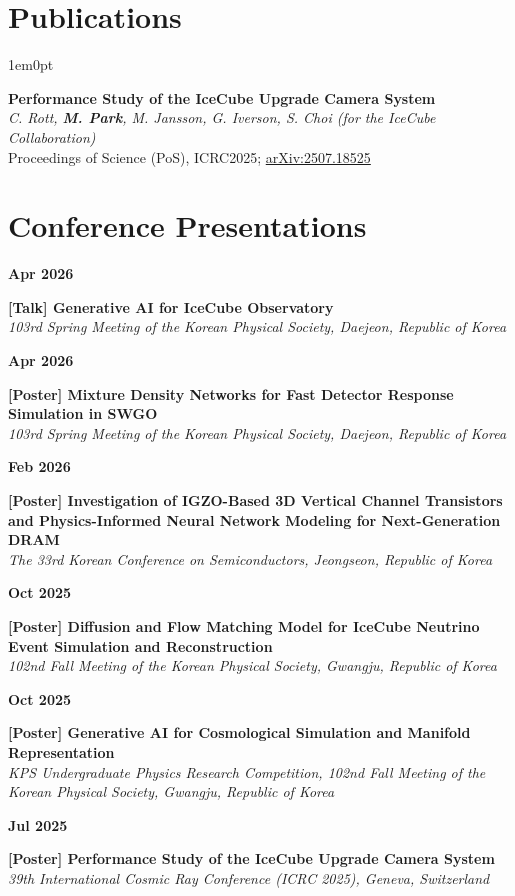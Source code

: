\documentclass[11pt, a4paper]{article}
\newcommand{\conferenceitem}[3]{%
    \noindent
    \parbox[t]{0.15\textwidth}{{\color{primary}\textbf{#1}}}%
    \hfill
    \parbox[t]{0.83\textwidth}{\textbf{#2}\\[2pt]\textit{#3}}%
    \vspace{8pt}\par
}
\newenvironment{secbody}{\begin{adjustwidth}{1em}{0pt}}{\end{adjustwidth}}
\begin{document}
\section{Publications}
\begin{secbody}

\newcommand{\publication}[3]{
    \noindent
    \textbf{#1} \\
    \textit{#2} \\
    {\small #3}
    \vspace{6pt}
}

\publication{Performance Study of the IceCube Upgrade Camera System}
{C. Rott, \textbf{\textit{M. Park}}, M. Jansson, G. Iverson, S. Choi (for the IceCube Collaboration)}
{Proceedings of Science (PoS), ICRC2025; \href{https://arxiv.org/abs/2507.18525}{arXiv:2507.18525}}
\end{secbody}

\newpage
\section{Conference Presentations}
\conferenceitem{Apr 2026}{[Talk] Generative AI for IceCube Observatory}{103rd Spring Meeting of the Korean Physical Society, Daejeon, Republic of Korea}

\conferenceitem{Apr 2026}{[Poster] Mixture Density Networks for Fast Detector Response Simulation in SWGO}{103rd Spring Meeting of the Korean Physical Society, Daejeon, Republic of Korea}

\conferenceitem{Feb 2026}{[Poster] Investigation of IGZO-Based 3D Vertical Channel Transistors and Physics-Informed Neural Network Modeling for Next-Generation DRAM}{The 33rd Korean Conference on Semiconductors, Jeongseon, Republic of Korea}

\conferenceitem{Oct 2025}{[Poster] Diffusion and Flow Matching Model for IceCube Neutrino Event Simulation and Reconstruction}{102nd Fall Meeting of the Korean Physical Society, Gwangju, Republic of Korea}

\conferenceitem{Oct 2025}{[Poster] Generative AI for Cosmological Simulation and Manifold Representation}{KPS Undergraduate Physics Research Competition, 102nd Fall Meeting of the Korean Physical Society, Gwangju, Republic of Korea}

\conferenceitem{Jul 2025}{[Poster] Performance Study of the IceCube Upgrade Camera System}{39th International Cosmic Ray Conference (ICRC 2025), Geneva, Switzerland}
\end{document}
